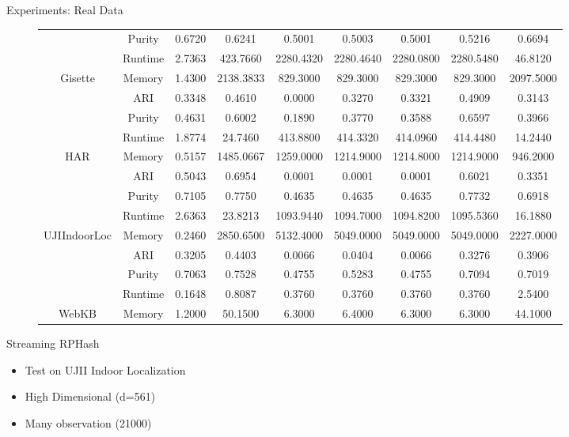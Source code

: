 \documentclass[12pt]{beamer}
\begin{document}
\begin{frame}[plain]{Experiments: Real Data}
\begin{figure}
\begin{table}
{\begin{tabular}{|c|c|c|c|c|c|c|c|c|}
 & Purity  & 0.6720 &     0.6241 &    0.5001 &    0.5003 &    0.5001 &    0.5216 &    0.6694 \\
 & Runtime & 2.7363 &   423.7660 & 2280.4320 & 2280.4640 & 2280.0800 & 2280.5480 &   46.8120 \\
\multirow{-4}{*}{Gisette}
 & Memory  & 1.4300 &  2138.3833 &  829.3000 &  829.3000 &  829.3000 &  829.3000 & 2097.5000 \\ \hline
 & ARI     & 0.3348 &     0.4610 &    0.0000 &    0.3270 &    0.3321 &    0.4909 &    0.3143 \\
 & Purity  & 0.4631 &     0.6002 &    0.1890 &    0.3770 &    0.3588 &    0.6597 &    0.3966 \\
 & Runtime & 1.8774 &    24.7460 &  413.8800 &  414.3320 &  414.0960 &  414.4480 &   14.2440 \\
\multirow{-4}{*}{HAR}
 & Memory  & 0.5157 &  1485.0667 & 1259.0000 & 1214.9000 & 1214.8000 & 1214.9000 &  946.2000 \\ \hline
 & ARI     & 0.5043 &     0.6954 &    0.0001 &    0.0001 &    0.0001 &    0.6021 &    0.3351 \\
 & Purity  & 0.7105 &     0.7750 &    0.4635 &    0.4635 &    0.4635 &    0.7732 &    0.6918 \\
 & Runtime & 2.6363 &    23.8213 & 1093.9440 & 1094.7000 & 1094.8200 & 1095.5360 &   16.1880 \\
\multirow{-4}{*}{UJIIndoorLoc}
  & Memory  & 0.2460 & 2850.6500 & 5132.4000 & 5049.0000 & 5049.0000 & 5049.0000 & 2227.0000 \\ \hline
  & ARI     & 0.3205 &    0.4403 &    0.0066 &    0.0404 &    0.0066 &    0.3276 &    0.3906 \\
  & Purity  & 0.7063 &    0.7528 &    0.4755 &    0.5283 &    0.4755 &    0.7094 &    0.7019 \\
  & Runtime & 0.1648 &    0.8087 &    0.3760 &    0.3760 &    0.3760 &    0.3760 &    2.5400 \\
\multirow{-4}{*}{WebKB}
 & Memory  & 1.2000 &    50.1500 &    6.3000 &    6.4000 &    6.3000 &    6.3000 &   44.1000 \\ \hline
\end{tabular}
}
\end{table}
\end{figure}
\end{frame}

\begin{frame}[plain]{Streaming RPHash}
 \begin{itemize}
  \item Test on UJII Indoor Localization
  \item High Dimensional (d=561)
  \item Many observation (21000)
 \end{itemize}
\end{frame}
\end{document}
